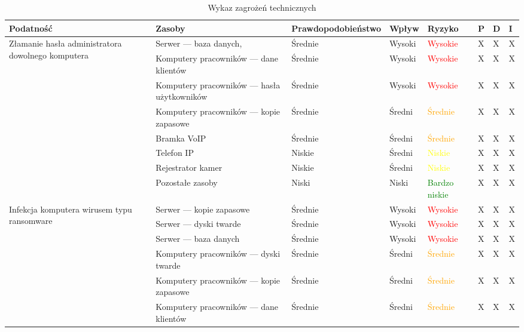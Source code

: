 \begin{landscape}
	\begin{longtable}[ht!]{|m{4cm}|m{6cm}|m{4.5cm}|m{2.5cm}|m{2.5cm}|m{0.5cm}|m{0.5cm}|m{0.5cm}|}
		\caption{Wykaz zagrożeń technicznych}
		\label{tab:zagrozenia_techniczne2}\\
		\hline	
		\textbf{Podatność} & \textbf{Zasoby} & \textbf{Prawdopodobieństwo} & \textbf{Wpływ} &  \textbf{Ryzyko} & \textbf{P} & \textbf{D} & \textbf{I} \\ \hline
		\multirow{5}{4cm}{Złamanie hasła administratora dowolnego komputera}  
		&   Serwer --- baza danych,  & Średnie & Wysoki & \textcolor{red}{Wysokie} & X & X & X  \\ \cline{2-8}
		& Komputery pracowników --- dane klientów & Średnie & Wysoki & \textcolor{red}{Wysokie}  & X & X & X  \\ \cline{2-8}
		& Komputery pracowników --- hasła użytkowników & Średnie & Wysoki & \textcolor{red}{Wysokie}  & X & X & X  \\ \cline{2-8}
		& Komputery pracowników --- kopie zapasowe & Średnie & Średni & \textcolor{orange}{Średnie}  & X & X & X  \\ \cline{2-8}
		& Bramka VoIP & Średnie & Średni & \textcolor{orange}{Średnie}  & X & X & X  \\ \cline{2-8}
		& Telefon IP & Niskie & Średni & \textcolor{yellow}{Niskie}  & X & X & X  \\ \cline{2-8}
		& Rejestrator kamer & Niskie & Średni & \textcolor{yellow}{Niskie}  & X & X & X  \\ \cline{2-8}
		& Pozostałe zasoby & Niski & Niski & \textcolor{green}{Bardzo niskie} & X & X & X  \\ \cline{2-8}
		\hline
		\multirow{8}{4cm}{Infekcja komputera wirusem typu ransomware}
		& Serwer --- kopie zapasowe & Średnie & Wysoki & \textcolor{red}{Wysokie}& X & X & X  \\ \cline{2-8} \cline{2-5}
		& Serwer --- dyski twarde & Średnie & Wysoki & \textcolor{red}{Wysokie} & X & X & X  \\ \cline{2-8}
		& Serwer --- baza danych & Średnie & Wysoki & \textcolor{red}{Wysokie} & X & X & X  \\ \cline{2-8}
		& Komputery pracowników --- dyski twarde & Średnie & Średni & \textcolor{orange}{Średnie} & X & X & X  \\ \cline{2-8}
		& Komputery pracowników --- kopie zapasowe & Średnie & Średni & \textcolor{orange}{Średnie} & X & X & X  \\ \cline{2-8}
		& Komputery pracowników --- dane klientów & Średnie & Średni & \textcolor{orange}{Średnie} & X & X & X  \\ \cline{2-8}

\end{longtable}
\end{landscape}
